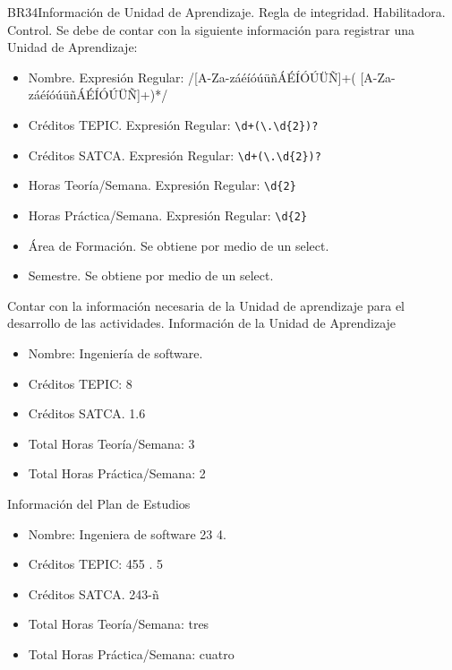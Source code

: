 \begin{BussinesRule}{BR34}{Información de Unidad de Aprendizaje.}
	\BRitem[Tipo:] Regla de integridad.
	\BRitem[Clase:] Habilitadora.
	\BRitem[Nivel:] Control.
	\BRitem[Descripción:]Se debe de contar con la siguiente información para registrar una Unidad de Aprendizaje:
	\begin{itemize}
		\item Nombre. Expresión Regular: /[A-Za-záéíóúüñÁÉÍÓÚÜÑ]+( [A-Za-záéíóúüñÁÉÍÓÚÜÑ]+)*/
		\item Créditos TEPIC. Expresión Regular: \verb|\d+(\.\d{2})?|
		\item Créditos SATCA. Expresión Regular: \verb|\d+(\.\d{2})?|
		\item Horas Teoría/Semana. Expresión Regular: \verb|\d{2}|
		\item Horas Práctica/Semana. Expresión Regular: \verb|\d{2}|
		\item Área de Formación. Se obtiene por medio de un select.
		\item Semestre. Se obtiene por medio de un select.
	\end{itemize}
	\BRitem[Motivación:] Contar con la información necesaria de la Unidad de aprendizaje para el desarrollo de las actividades.
	 Información de la Unidad de Aprendizaje
	\begin{itemize}
		\item Nombre: Ingeniería de software.
		\item Créditos TEPIC: 8
		\item Créditos SATCA. 1.6
		\item Total Horas Teoría/Semana: 3
		\item Total Horas Práctica/Semana: 2
	\end{itemize}
	 Información del Plan de Estudios
	\begin{itemize}
		\item Nombre: Ingeniera de software 23 4.
		\item Créditos TEPIC: 455 . 5
		\item Créditos SATCA. 243-ñ
		\item Total Horas Teoría/Semana: tres
		\item Total Horas Práctica/Semana: cuatro
	\end{itemize}
\end{BussinesRule}
